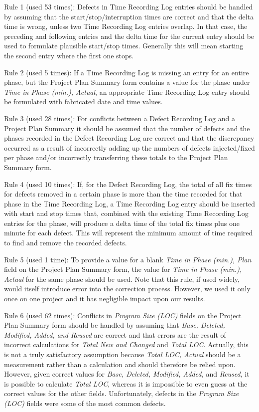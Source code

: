   Rule 1 (used 53 times): Defects in Time Recording Log entries should be
  handled by assuming that the start/stop/interruption times are correct
  and that the delta time is wrong, unless two Time Recording Log entries
  overlap.  In that case, the preceding and following entries and the delta
  time for the current entry should be used to formulate plausible
  start/stop times.  Generally this will mean starting the second entry
  where the first one stops.

      
  Rule 2 (used 5 times): If a Time Recording Log is missing an entry for
  an entire phase, but the Project Plan Summary form contains a value for
  the phase under {\it Time in Phase (min.), Actual}, an appropriate Time
  Recording Log entry should be formulated with fabricated date and time
  values.
        
  Rule 3 (used 28 times): For conflicts between a Defect Recording Log and a Project Plan Summary
  it should be assumed that the number of defects and the phases recorded
  in the Defect Recording Log are correct and that the discrepancy occurred
  as a result of incorrectly adding up the numbers of defects
  injected/fixed per phase and/or incorrectly transferring these totals to
  the Project Plan Summary form.
      
  Rule 4 (used 10 times): If, for the Defect Recording Log, the total of
  all fix times for defects removed in a certain phase is more than the
  time recorded for that phase in the Time Recording Log, a Time Recording
  Log entry should be inserted with start and stop times that, combined
  with the existing Time Recording Log entries for the phase, will produce
  a delta time of the total fix times plus one minute for each defect.
  This will represent the minimum amount of time required to find and
  remove the recorded defects.
      
  Rule 5 (used 1 time): To provide a value for a blank {\it Time in Phase
    (min.), Plan} field on the Project Plan Summary form, the value for
  {\it Time in Phase (min.), Actual} for the same phase should be
  used. Note that this rule, if used widely, would itself introduce
  error into the correction process. However, we used it only once 
  on one project and it has negligible impact upon our results.
    
  Rule 6 (used 62 times): Conflicts in {\it Program Size (LOC)} fields on
  the Project Plan Summary form should be handled by assuming that {\it
    Base, Deleted, Modified, Added, and Reused} are correct and that errors
  are the result of incorrect calculations for {\it Total New and Changed}
  and {\it Total LOC}.  Actually, this is not a truly satisfactory
  assumption because {\it Total LOC, Actual} should be a measurement rather
  than a calculation and should therefore be relied upon.  However, given
  correct values for {\it Base, Deleted, Modified, Added,} and {\it
    Reused}, it is possible to calculate {\it Total LOC}, whereas it is
  impossible to even guess at the correct values for the other fields.
  Unfortunately, defects in the {\it Program Size (LOC)} fields were some
  of the most common defects.  


